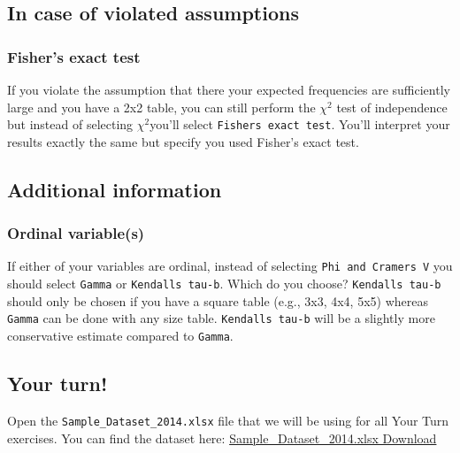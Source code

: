 \documentclass[
]{book}
\begin{document}
\hypertarget{in-case-of-violated-assumptions-3}{%
\subsection{In case of violated assumptions}\label{in-case-of-violated-assumptions-3}}

\hypertarget{fishers-exact-test}{%
\subsubsection{Fisher's exact test}\label{fishers-exact-test}}

If you violate the assumption that there your expected frequencies are sufficiently large and you have a 2x2 table, you can still perform the \(\chi^2\) test of independence but instead of selecting \(\chi^2\)you'll select \texttt{Fisher\textquotesingle{}s\ exact\ test}. You'll interpret your results exactly the same but specify you used Fisher's exact test.

\hypertarget{additional-information-2}{%
\subsection{Additional information}\label{additional-information-2}}

\hypertarget{ordinal-variables}{%
\subsubsection{Ordinal variable(s)}\label{ordinal-variables}}

If either of your variables are ordinal, instead of selecting \texttt{Phi\ and\ Cramer\textquotesingle{}s\ V} you should select \texttt{Gamma} or \texttt{Kendall\textquotesingle{}s\ tau-b}. Which do you choose? \texttt{Kendall\textquotesingle{}s\ tau-b} should only be chosen if you have a square table (e.g., 3x3, 4x4, 5x5) whereas \texttt{Gamma} can be done with any size table. \texttt{Kendall\textquotesingle{}s\ tau-b} will be a slightly more conservative estimate compared to \texttt{Gamma}.

\hypertarget{your-turn-4}{%
\subsection{Your turn!}\label{your-turn-4}}

Open the \texttt{Sample\_Dataset\_2014.xlsx} file that we will be using for all Your Turn exercises. You can find the dataset here: \href{https://github.com/danawanzer/stats-with-jamovi/blob/master/data/Sample_Dataset_2014.xlsx}{Sample\_Dataset\_2014.xlsx Download}
\end{document}
